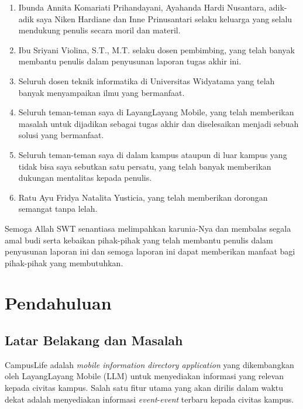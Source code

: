 \documentclass[a4paper, 12pt, oneside]{report}
\begin{document}
\begin{enumerate}
  \item Ibunda Annita Komariati Prihandayani, Ayahanda Hardi Nusantara, adik-adik saya Niken Hardiane dan Inne Prinusantari selaku keluarga yang selalu mendukung penulis secara moril dan materil.
  \item Ibu Sriyani Violina, S.T., M.T. selaku dosen pembimbing, yang telah banyak membantu penulis dalam penyusunan laporan tugas akhir ini.
  \item Seluruh dosen teknik informatika di Universitas Widyatama yang telah banyak menyampaikan ilmu yang bermanfaat.
  \item Seluruh teman-teman saya di LayangLayang Mobile, yang telah memberikan masalah untuk dijadikan sebagai tugas akhir dan diselesaikan menjadi sebuah solusi yang bermanfaat.
  \item Seluruh teman-teman saya di dalam kampus ataupun di luar kampus yang
tidak bisa saya sebutkan satu persatu, yang telah banyak memberikan dukungan mentalitas kepada penulis.
  \item Ratu Ayu Fridya Natalita Yusticia, yang telah memberikan dorongan semangat tanpa lelah.
\end{enumerate}

\onehalfspacing Semoga Allah SWT senantiasa melimpahkan karunia-Nya dan membalas segala amal budi serta kebaikan pihak-pihak yang telah membantu penulis dalam penyusunan laporan ini dan semoga laporan ini dapat memberikan manfaat bagi pihak-pihak yang membutuhkan.

\onehalfspacing
{}
\tableofcontents
\setcounter{secnumdepth}{5}
\setcounter{tocdepth}{7}

\listoffigures

\chapter{Pendahuluan}
\section{Latar Belakang dan Masalah}
\onehalfspacing CampusLife adalah \textit{mobile information directory application} yang dikembangkan oleh LayangLayang Mobile (LLM) untuk menyediakan informasi yang relevan kepada civitas kampus. Salah satu fitur utama yang akan dirilis dalam waktu dekat adalah menyediakan informasi \textit{event}-\textit{event} terbaru kepada civitas kampus. 
\end{document}

